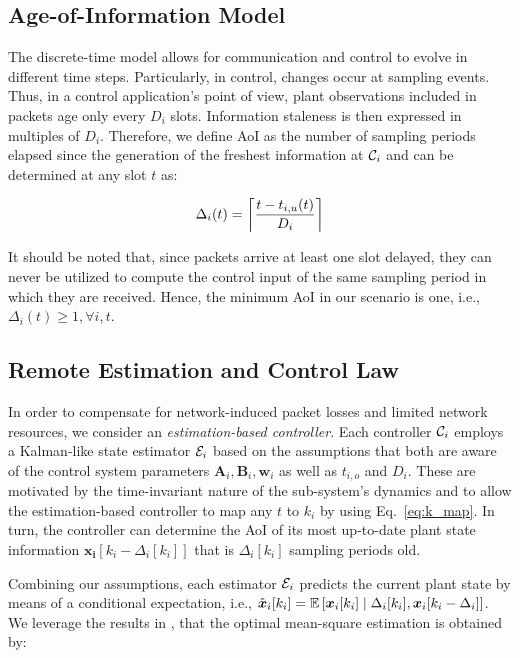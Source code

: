 \subsection{Age-of-Information Model}
The discrete-time model allows for communication and control to evolve in
different time steps. Particularly, in control, changes occur at sampling
events. Thus, in a control application's point of view, plant observations
included in packets age only every $D_i$ slots. Information staleness is then
expressed in multiples of $D_i$. Therefore, we define AoI as the number of
sampling periods elapsed since the generation of the freshest information at
$\mathcal{C}_i$ and can be determined at any slot $t$ as:

\begin{equation}
  \label{eq:aoi}
  \Delta_i(t) = \left\lceil \dfrac{t - t_{i,u}(t)}{D_{i}} \right\rceil 
\end{equation}

It should be noted that, since packets arrive at least one slot delayed, they
can never be utilized to compute the control input of the same sampling period
in which they are received. Hence, the minimum AoI in our scenario is one, i.e.,
$\Delta_i(t) \ge 1,\forall i,t$.

\subsection{Remote Estimation and Control Law}
In order to compensate for network-induced packet losses and limited network
resources, we consider an \textit{estimation-based controller}. Each controller
$\mathcal{C}_i$ employs a Kalman-like state estimator $\mathcal{E}_i$ based on the
assumptions that both are aware of the control system parameters
$\boldsymbol{A}_i, \boldsymbol{B}_i, \boldsymbol{w}_i$ as well as $t_{i,o}$ and
$D_i$. These are motivated by the time-invariant nature of the sub-system's
dynamics and to allow the estimation-based controller to map any $t$ to $k_i$
by using Eq.~\eqref{eq:k_map}. In turn, the controller can determine the AoI of
its most up-to-date plant state information
$\boldsymbol{x_i}[k_i-\Delta_i[k_i]]$ that is $\Delta_i[k_i]$ sampling periods
old.

Combining our assumptions, each estimator $\mathcal{E}_i$ predicts the current
plant state by means of a conditional expectation, i.e.,
$\hat{\boldsymbol{x}}_i[k_i] = \mathbb{E}\left[\boldsymbol{x}_i[k_i] \mid
\Delta_i[k_i],\boldsymbol{x}_i[k_i-\Delta_i] \right]$. We leverage the results
in \cite{ayan2019age}, that the optimal mean-square estimation is obtained by:

